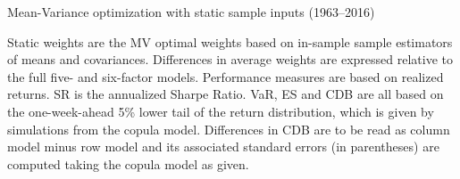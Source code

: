 
\begin{table}
  \centering
  \footnotesize
  \renewcommand{\arraystretch}{1.2}

  \caption{Mean-Variance optimization with static sample inputs (1963--2016)}

  \begin{longcaption}
    Static weights are the MV optimal weights based on in-sample sample estimators of means and covariances. Differences in average weights are expressed relative to the full five- and six-factor models. Performance measures are based on realized returns. SR is the annualized Sharpe Ratio. VaR, ES and CDB are all based on the one-week-ahead 5\% lower tail of the return distribution, which is given by simulations from the copula model. Differences in CDB are to be read as column model minus row model and its associated standard errors (in parentheses) are computed taking the copula model as given.
  \end{longcaption}

  \label{tab:mw_mv_sample}


\end{table}
